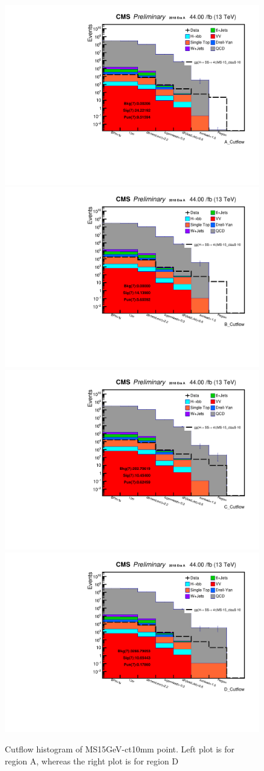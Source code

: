  \begin{figure}[h!]
   \caption{Cutflow histogram of MS15GeV-ct10mm point. Left plot is for region A, whereas the right plot is for region D}
   \label{fig:ABmethod}
   \centering
   \includegraphics[width=0.47\linewidth]{figs/log_CutflAnalysisNote_MS-15_ctauS-10_A_Cutflow.pdf}
   \includegraphics[width=0.47\linewidth]{figs/log_CutflAnalysisNote_MS-15_ctauS-10_B_Cutflow.pdf}
   \includegraphics[width=0.47\linewidth]{figs/log_CutflAnalysisNote_MS-15_ctauS-10_C_Cutflow.pdf}
   \includegraphics[width=0.47\linewidth]{figs/log_CutflAnalysisNote_MS-15_ctauS-10_D_Cutflow.pdf}
 \end{figure}

